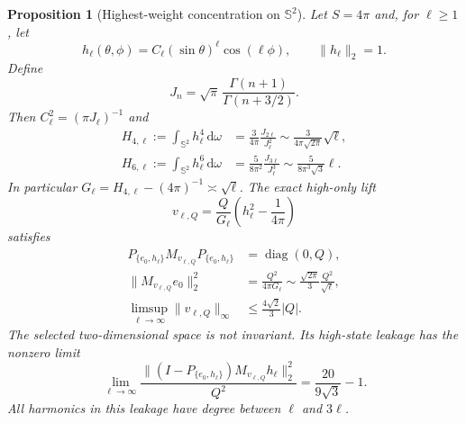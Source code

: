 \documentclass[11pt]{article}
\newcommand{\dd}{\,\mathrm d}
\DeclareMathOperator{\diag}{diag}
\newtheorem{proposition}[theorem]{Proposition}
\theoremstyle{definition}
\theoremstyle{remark}
\begin{document}
\begin{proposition}[Highest-weight concentration on $\mathbb S^2$]
\label{prop:highest-weight-scalar-lift}
Let $S=4\pi$ and, for $\ell\geq1$, let
\begin{equation}
 h_\ell(\theta,\phi)
 =C_\ell(\sin\theta)^\ell\cos(\ell\phi),
 \qquad \|h_\ell\|_2=1.
 \label{eq:real-highest-weight}
\end{equation}
Define
\begin{equation}
 J_n=\sqrt\pi\,\frac{\Gamma(n+1)}{\Gamma(n+3/2)}.
\end{equation}
Then $C_\ell^2=(\pi J_\ell)^{-1}$ and
\begin{align}
 H_{4,\ell}:=\int_{\mathbb S^2}h_\ell^4\dd\omega
 &=\frac{3}{4\pi}\frac{J_{2\ell}}{J_\ell^2}
 \sim\frac{3}{4\pi\sqrt{2\pi}}\sqrt\ell,\label{eq:highest-H4}\\
 H_{6,\ell}:=\int_{\mathbb S^2}h_\ell^6\dd\omega
 &=\frac{5}{8\pi^2}\frac{J_{3\ell}}{J_\ell^3}
 \sim\frac{5}{8\pi^3\sqrt3}\ell.
 \label{eq:highest-H6}
\end{align}
In particular $G_\ell=H_{4,\ell}-(4\pi)^{-1}\asymp\sqrt\ell$.  The exact
high-only lift
\begin{equation}
 v_{\ell,Q}=\frac{Q}{G_\ell}
 \left(h_\ell^2-\frac1{4\pi}\right)
 \label{eq:highest-exact-barrier}
\end{equation}
satisfies
\begin{align}
 P_{\{e_0,h_\ell\}}M_{v_{\ell,Q}}P_{\{e_0,h_\ell\}}
 &=\diag(0,Q),\label{eq:highest-exact-block}\\
 \|M_{v_{\ell,Q}}e_0\|_2^2
 &=\frac{Q^2}{4\pi G_\ell}
 \sim\frac{\sqrt{2\pi}}{3}\frac{Q^2}{\sqrt\ell},
 \label{eq:highest-column-cost}\\
 \limsup_{\ell\to\infty}\|v_{\ell,Q}\|_\infty
 &\leq\frac{4\sqrt2}{3}|Q|.
 \label{eq:highest-uniform-bound}
\end{align}
The selected two-dimensional space is not invariant.  Its high-state leakage
has the nonzero limit
\begin{equation}
 \lim_{\ell\to\infty}
 \frac{\|(I-P_{\{e_0,h_\ell\}})M_{v_{\ell,Q}}h_\ell\|_2^2}{Q^2}
 =\frac{20}{9\sqrt3}-1.
 \label{eq:highest-minimizer-leakage}
\end{equation}
All harmonics in this leakage have degree between $\ell$ and $3\ell$.
\end{proposition}
\end{document}
